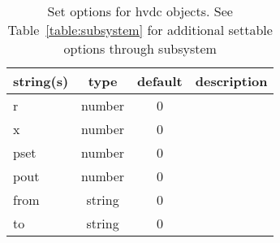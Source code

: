 \begin{table}[ht]
\centering
\begin{tabular}{p{5cm} c c p{7cm}}
\hline
string(s) & type & default & description \\
\hline
r & number & 0 & \\
x & number & 0 & \\
pset & number & 0 & \\
pout & number & 0 & \\
from & string & 0 & \\
to & string & 0 & \\
\hline
\end{tabular}
\caption{Set options for hvdc objects. See Table~\ref{table:subsystem} for additional settable options through subsystem}
\label{table:hvdc}
\end{table}

